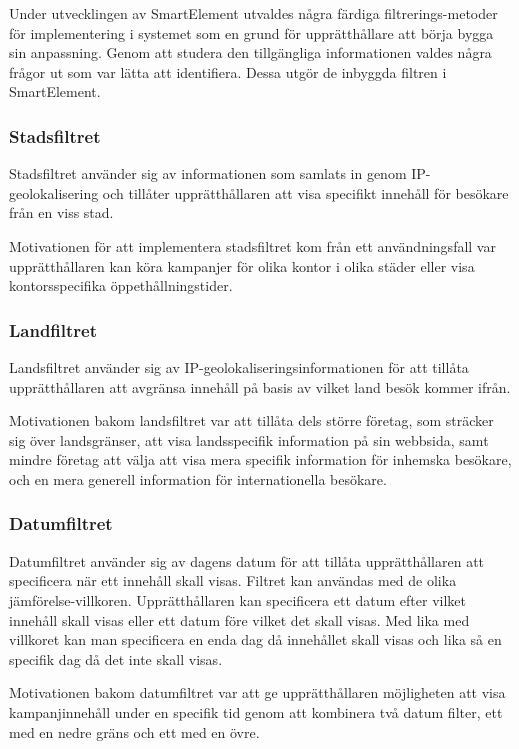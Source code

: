 Under utvecklingen av SmartElement utvaldes några färdiga filtrerings-metoder för implementering i systemet som en grund för upprätthållare att börja bygga sin anpassning. Genom att studera den tillgängliga informationen valdes några frågor ut som var lätta att identifiera. Dessa utgör de inbyggda filtren i SmartElement.

\subsubsection{Stadsfiltret}

Stadsfiltret använder sig av informationen som samlats in genom IP-geolokalisering och tillåter upprätthållaren att visa specifikt innehåll för besökare från en viss stad.

Motivationen för att implementera stadsfiltret kom från ett användningsfall var upprätthållaren kan köra kampanjer för olika kontor i olika städer eller visa kontorsspecifika öppethållningstider.

\subsubsection{Landfiltret}

Landsfiltret använder sig av IP-geolokaliseringsinformationen för att tillåta upprätthållaren att avgränsa innehåll på basis av vilket land besök kommer ifrån.

Motivationen bakom landsfiltret var att tillåta dels större företag, som sträcker sig över landsgränser, att visa landsspecifik information på sin webbsida, samt mindre företag att välja att visa mera specifik information för inhemska besökare, och en mera generell information för internationella besökare.

\subsubsection{Datumfiltret}

Datumfiltret använder sig av dagens datum för att tillåta upprätthållaren att specificera när ett innehåll skall visas. Filtret kan användas med de olika jämförelse-villkoren. Upprätthållaren kan specificera ett datum efter vilket innehåll skall visas eller ett datum före vilket det skall visas. Med lika med villkoret kan man specificera en enda dag då innehållet skall visas och lika så en specifik dag då det inte skall visas.

Motivationen bakom datumfiltret var att ge upprätthållaren möjligheten att visa kampanjinnehåll under en specifik tid genom att kombinera två datum filter, ett med en nedre gräns och ett med en övre.

